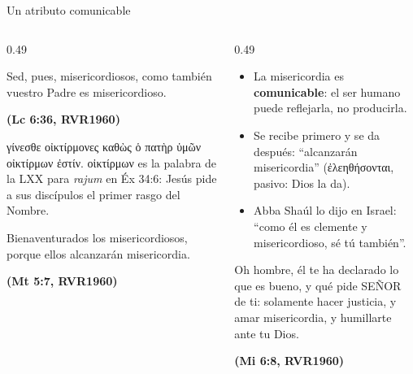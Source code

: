 \documentclass[hyperref={bookmarks=false},aspectratio=169]{beamer}
\newcommand{\grc}[1]{\foreignlanguage{ancientgreek}{#1}}
\newcommand{\SENOR}{S{\fontsize{0.78em}{1em}\selectfont EÑOR}}
\newcommand{\fuente}[1]{\par\hfill{\upshape\bfseries\footnotesize\textcolor{azul}{#1}}}
\newcommand{\destacar}[1]{\textbf{\textcolor{azul}{#1}}}
\begin{document}
\begin{frame}{Un atributo comunicable}
\begin{columns}[t,onlytextwidth]
\begin{column}{0.49\textwidth}
\begin{cita}Sed, pues, misericordiosos, como también vuestro Padre es misericordioso.\fuente{(Lc 6:36, RVR1960)}\end{cita}
\scriptsize\grc{γίνεσθε οἰκτίρμονες καθὼς ὁ πατὴρ ὑμῶν οἰκτίρμων ἐστίν}. \grc{οἰκτίρμων} es la palabra de la LXX para \emph{rajum} en Éx 34:6: Jesús pide a sus discípulos el primer rasgo del Nombre.
\begin{cita}Bienaventurados los misericordiosos, porque ellos alcanzarán misericordia.\fuente{(Mt 5:7, RVR1960)}\end{cita}
\end{column}
\begin{column}{0.49\textwidth}\small
\begin{itemize}
\item La misericordia es \destacar{comunicable}: el ser humano puede reflejarla, no producirla.
\item Se recibe primero y se da después: ``alcanzarán misericordia'' (\grc{ἐλεηθήσονται}, pasivo: Dios la da).
\item Abba Shaúl lo dijo en Israel: ``como él es clemente y misericordioso, sé tú también''.
\end{itemize}
\begin{cita}Oh hombre, él te ha declarado lo que es bueno, y qué pide \SENOR{} de ti: solamente hacer justicia, y amar misericordia, y humillarte ante tu Dios.\fuente{(Mi 6:8, RVR1960)}\end{cita}
\end{column}
\end{columns}
\end{frame}
\end{document}
